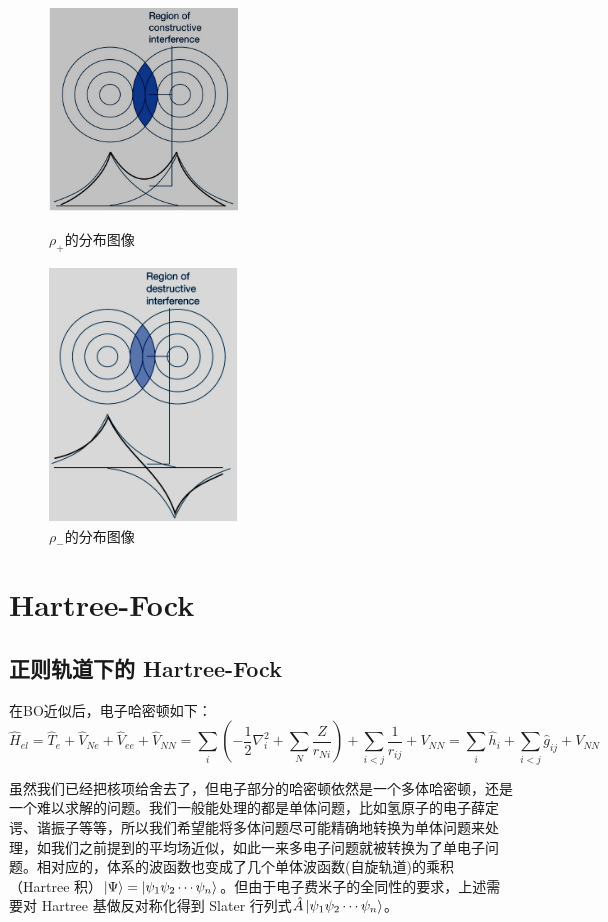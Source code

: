 \begin{figure}[htbp]
    \centering
    \begin{minipage}[t]{0.48\textwidth}
    \centering
    \includegraphics[width=5cm]{fig/lzhx/微信图片_20211102112346.png}
    \caption{$\rho_+$的分布图像}
    \end{minipage}
    \begin{minipage}[t]{0.48\textwidth}
    \centering
    \includegraphics[width=5cm]{fig/lzhx/微信图片_202111021123461.png}
    \caption{$\rho_-$的分布图像}
    \end{minipage}
\end{figure}

\section{Hartree-Fock}
\subsection{正则轨道下的 Hartree-Fock}\label{sec:hf}
在BO近似后，电子哈密顿如下：
\[\hat{H}_{el}=\hat{T}_e+\hat{V}_{Ne}+\hat{V}_{ee}+\hat{V}_{NN}=\sum_i\left(-\frac{1}{2}\nabla^2_i+\sum_N\frac{Z}{r_{Ni}}\right)+\sum_{i<j}\frac{1}{r_{ij}}+V_{NN}=\sum_i\hat{h}_i+\sum_{i<j}\hat{g}_{ij}+V_{NN}\]

虽然我们已经把核项给舍去了，但电子部分的哈密顿依然是一个多体哈密顿，还是一个难以求解的问题。我们一般能处理的都是单体问题，比如氢原子的电子薛定谔、谐振子等等，所以我们希望能将多体问题尽可能精确地转换为单体问题来处理，如我们之前提到的平均场近似，如此一来多电子问题就被转换为了单电子问题。相对应的，体系的波函数也变成了几个单体波函数(自旋轨道)的乘积（Hartree 积）$\ket{\Psi}=\ket{\psi_1\psi_2\cdots \psi_n}$。但由于电子费米子的全同性的要求，上述需要对 Hartree 基做反对称化得到 Slater 行列式$\hat{A}\ket{\psi_1\psi_2\cdots \psi_n}$。

